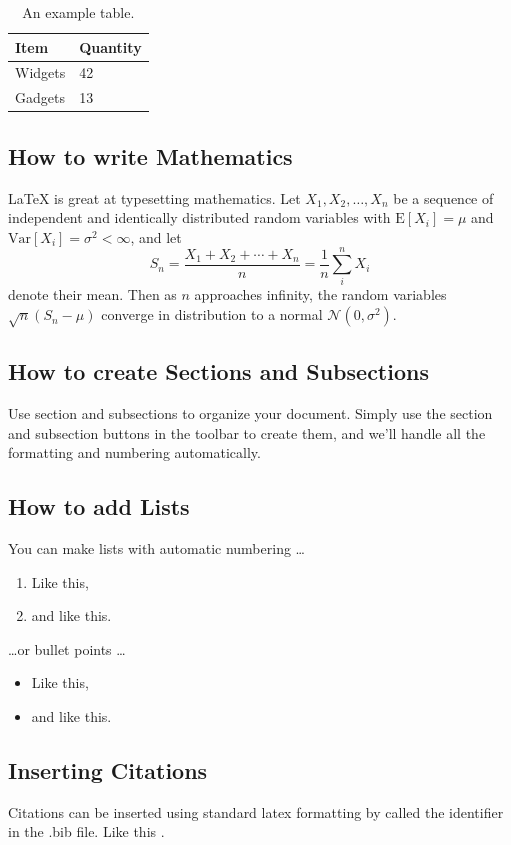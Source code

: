 \documentclass[a4paper]{article}
\begin{document}
\begin{table}
\centering
\begin{tabular}{@{}l l@{}}
\toprule
Item & Quantity \\
\midrule
Widgets & 42 \\
Gadgets & 13 \\
\bottomrule
\end{tabular}
\caption{\label{tab:widgets}An example table.}
\end{table}

\subsection{How to write Mathematics}

\LaTeX{} is great at typesetting mathematics. Let $X_1, X_2, \ldots, X_n$ be a sequence of independent and identically distributed random variables with $\text{E}[X_i] = \mu$ and $\text{Var}[X_i] = \sigma^2 < \infty$, and let
\[S_n = \frac{X_1 + X_2 + \cdots + X_n}{n}
      = \frac{1}{n}\sum_{i}^{n} X_i\]
denote their mean. Then as $n$ approaches infinity, the random variables $\sqrt{n}(S_n - \mu)$ converge in distribution to a normal $\mathcal{N}(0, \sigma^2)$.


\subsection{How to create Sections and Subsections}

Use section and subsections to organize your document. Simply use the section and subsection buttons in the toolbar to create them, and we'll handle all the formatting and numbering automatically.

\subsection{How to add Lists}

You can make lists with automatic numbering \dots

\begin{enumerate}
\item Like this,
\item and like this.
\end{enumerate}
\dots or bullet points \dots
\begin{itemize}
\item Like this,
\item and like this.
\end{itemize}

\subsection{Inserting Citations}
Citations can be inserted using standard latex formatting by called the identifier in the .bib file. Like this \citep{einstein1935can,Kucsko2013}.



\end{document}
